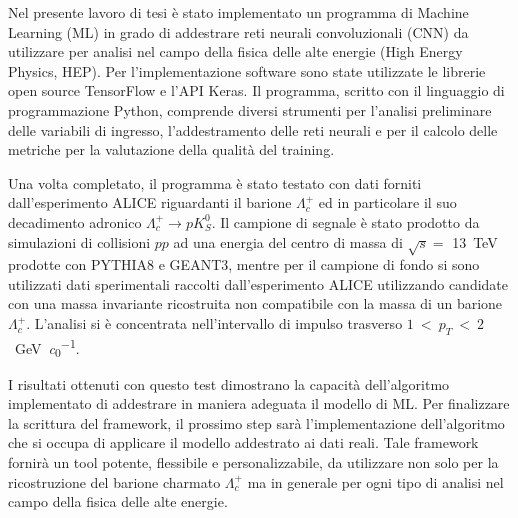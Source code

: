Nel presente lavoro di tesi è stato implementato un programma di Machine Learning (ML) in grado di addestrare reti neurali convoluzionali (CNN) da utilizzare per analisi nel campo della fisica delle alte energie (High Energy Physics, HEP). Per l’implementazione software sono state utilizzate le librerie open source TensorFlow e l’API Keras. Il programma, scritto con il linguaggio di programmazione Python, comprende diversi strumenti per l’analisi preliminare delle variabili di ingresso, l’addestramento delle reti neurali e per il calcolo delle metriche per la valutazione della qualità del training. 

Una volta completato, il programma è stato testato con dati forniti dall’esperimento ALICE riguardanti il barione $\Lambda_{c}^{+}$ ed in particolare il suo decadimento adronico $\Lambda_{c}^{+} \to p K^{0}_{S}$. Il campione di segnale è stato prodotto da simulazioni di collisioni $pp$ ad una energia del centro di massa di $\sqrt{s} = $ \qty{13}{\tera \eV} prodotte con PYTHIA8 e GEANT3, mentre per il campione di fondo si sono utilizzati dati sperimentali raccolti dall’esperimento ALICE utilizzando candidate con una massa invariante ricostruita non compatibile con la massa di un barione $\Lambda_{c}^{+}$. L’analisi si è concentrata nell’intervallo di impulso trasverso $1~<~p_{T}~<~2$~\unit{\giga \eV \per \clight}.

I risultati ottenuti con questo test dimostrano la capacità dell’algoritmo implementato di addestrare in maniera adeguata il modello di ML. Per finalizzare la scrittura del framework, il prossimo step sarà l’implementazione dell’algoritmo che si occupa di applicare il modello addestrato ai dati reali. Tale framework fornirà un tool potente, flessibile e personalizzabile, da utilizzare non solo per la ricostruzione del barione charmato $\Lambda_{c}^{+}$ ma in generale per ogni tipo di analisi nel campo della fisica delle alte energie.

